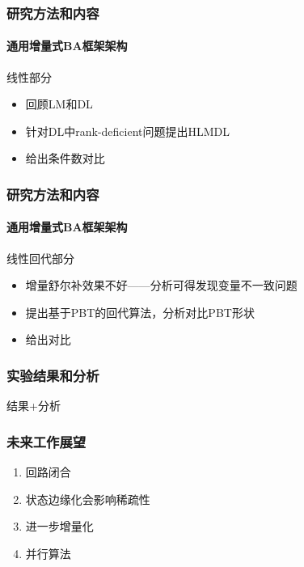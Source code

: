\documentclass{beamer}
\begin{document}
\begin{frame}
    \frametitle{研究方法和内容}
    \framesubtitle{通用增量式BA框架架构}

    线性部分
    \begin{itemize}
        \item 回顾LM和DL
        \item 针对DL中rank-deficient问题提出HLMDL
        \item 给出条件数对比
    \end{itemize}
\end{frame}

\begin{frame}
    \frametitle{研究方法和内容}
    \framesubtitle{通用增量式BA框架架构}

    线性回代部分
    \begin{itemize}
        \item 增量舒尔补效果不好——分析可得发现变量不一致问题
        \item 提出基于PBT的回代算法，分析对比PBT形状
        \item 给出对比
    \end{itemize}
\end{frame}

\begin{frame}
    \frametitle{实验结果和分析}
    结果+分析
\end{frame}

\begin{frame}
    \frametitle{未来工作展望}
    \begin{enumerate}
        \item 回路闭合
        \item 状态边缘化会影响稀疏性
        \item 进一步增量化
        \item 并行算法
    \end{enumerate}
\end{frame}
\end{document}
